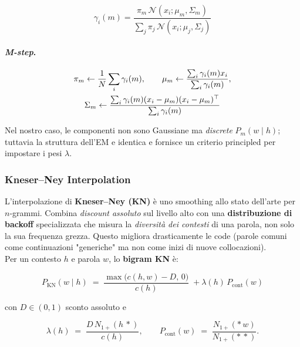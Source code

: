             $$\gamma_i(m)=\frac{\pi_m\,\mathcal{N}(x_i;\mu_m,\Sigma_m)}{\sum_j \pi_j\,\mathcal{N}(x_i;\mu_j,\Sigma_j)}$$
            
            \paragraph{\textit{M-step}.}
            
            \begin{gather} 
                \notag\pi_m\leftarrow\frac{1}{N}\sum_i\gamma_i(m),\qquad \mu_m\leftarrow \frac{\sum_i \gamma_i(m)x_i}{\sum_i \gamma_i(m)},\\
                \notag\Sigma_m\leftarrow \frac{\sum_i \gamma_i(m)(x_i-\mu_m)(x_i-\mu_m)^\top}{\sum_i \gamma_i(m)}
            \end{gather}
            
            Nel nostro caso, le componenti non sono Gaussiane ma \textit{discrete} $P_m(w\mid h)$; tuttavia la struttura dell’EM e identica e fornisce un criterio principled per impostare i pesi $\lambda$.

        \newpage

        \subsubsection{Kneser--Ney Interpolation}
        
            L'interpolazione di \textbf{Kneser--Ney (KN)} è uno smoothing allo stato dell'arte per $n$-grammi. Combina \textit{discount assoluto} sul livello alto con una \textbf{distribuzione di backoff} specializzata che misura la \textit{diversità dei contesti} di una parola, non solo la sua frequenza grezza. Questo migliora drasticamente le code (parole comuni come continuazioni "generiche" ma non come inizi di nuove collocazioni).\\
            
            Per un contesto $h$ e parola $w$, lo \textbf{bigram KN} è:
            
            $$
            P_{\text{KN}}(w\mid h) \;=\; \frac{\max\big(c(h,w)-D,\,0\big)}{c(h)} \;+
            \lambda(h)\,P_{\text{cont}}(w)
            $$
            
            con $D\in(0,1)$ sconto assoluto e
            
            $$
            \lambda(h) \;=\; \frac{D\, N_{1+}(h\,\ast)}{c(h)},\qquad
            P_{\text{cont}}(w) \;=\; \frac{N_{1+}(\ast\,w)}{N_{1+}(\ast\,\ast)}.
            $$
            
